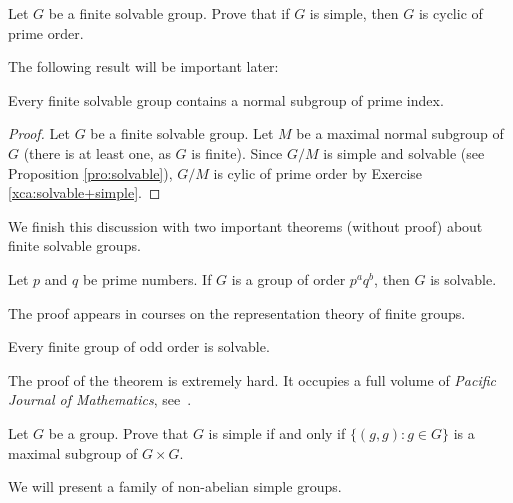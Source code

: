 
\begin{exercise}
\label{xca:solvable+simple}
    Let $G$ be a 
    finite solvable group. Prove that if $G$ is simple, then 
    $G$ is cyclic of prime order. 
\end{exercise}

The following result will be important later:

\begin{proposition}
    Every finite solvable group contains a normal subgroup of prime index. 
\end{proposition}

\begin{proof}
    Let $G$ be a finite solvable group. 
    Let $M$ be a maximal normal subgroup of $G$ (there is at least one, as $G$ is finite). 
    Since $G/M$ is simple and solvable (see Proposition \ref{pro:solvable}), 
    $G/M$ is cylic of prime order by Exercise \ref{xca:solvable+simple}.  
\end{proof}

We finish this discussion with two important theorems (without proof) 
about finite solvable groups. 

\begin{theorem}[Burnside]
    Let $p$ and $q$ be prime numbers. If $G$ is a group
    of order $p^aq^b$, then $G$ is solvable. 
\end{theorem}

The proof appears in courses on the 
representation theory of finite groups. 

\begin{theorem}
    Every finite group of odd order is solvable.
\end{theorem}

The proof of the theorem is extremely hard. It occupies a full volume of
\emph{Pacific Journal of Mathematics}, see~\cite{MR166261}.



\begin{exercise}
\label{xca:diagonal}
    Let $G$ be a group. 
    Prove that $G$ is simple if and only if 
    $\{(g,g):g\in G\}$ 
    is a maximal subgroup of $G\times G$. 
\end{exercise}


We will present a family of non-abelian simple groups. 

